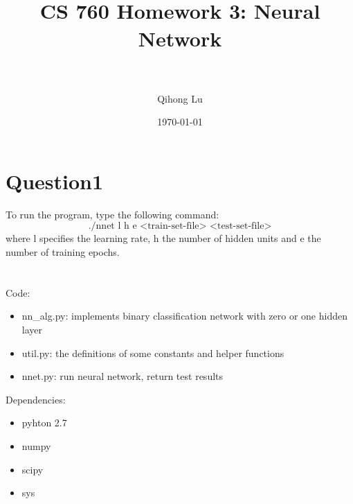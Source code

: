 \documentclass[paper=a4, fontsize=11pt]{scrartcl} %
\title{	
\normalfont \normalsize 
\horrule{0.5pt} \\[0.4cm] %
\huge CS 760 Homework 3: Neural Network\\ %
\horrule{2pt} \\[0.5cm] %
}
\author{Qihong Lu} %
\date{\normalsize\today} %
\numberwithin{equation}{section} %
\numberwithin{figure}{section} %
\numberwithin{table}{section} %
\begin{document}
\maketitle %


\section*{Question1}

To run the program, type the following command: 
$$ \text{./nnet l h e <train-set-file> <test-set-file>} $$ 
where l specifies the learning rate, h the number of hidden units and e the number of training epochs. \\\\\\

Code: 
\begin{itemize}
	\item nn\_alg.py: implements binary classification network with zero or one hidden layer 
	\item util.py: the definitions of some constants and helper functions 
	\item nnet.py: run neural network, return test results
\end{itemize}
 
\hfill 

Dependencies: 
\begin{itemize}
  \item pyhton 2.7 
  \item numpy 
  \item scipy 
  \item sys
\end{itemize}



\newpage
\end{document}

